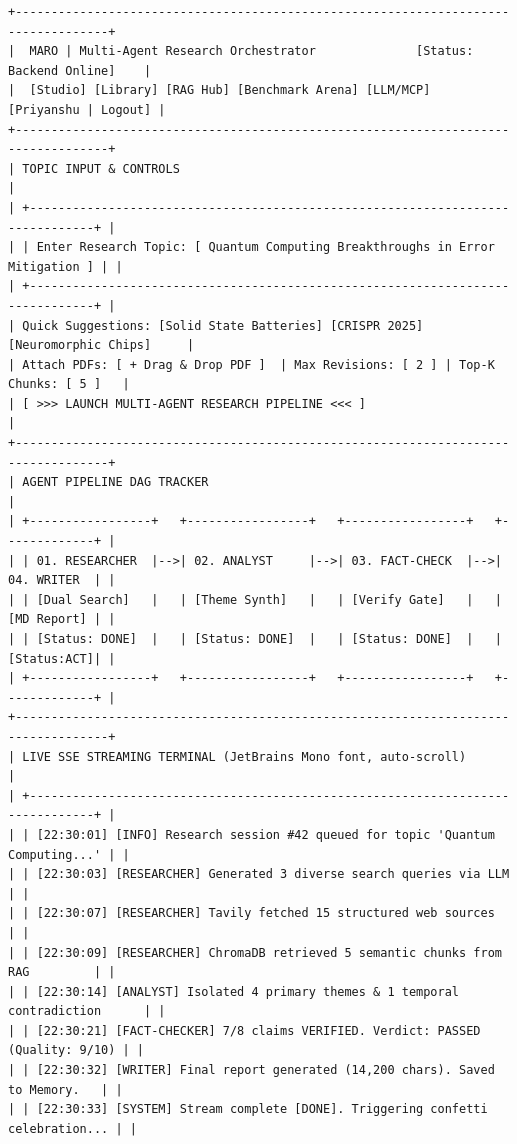 \documentclass[11pt,a4paper,twoside]{report}
\begin{document}
\begin{lstlisting}[language={},caption={ASCII Dashboard Layout}]
+-----------------------------------------------------------------------------------+
|  MARO | Multi-Agent Research Orchestrator              [Status: Backend Online]    |
|  [Studio] [Library] [RAG Hub] [Benchmark Arena] [LLM/MCP]       [Priyanshu | Logout] |
+-----------------------------------------------------------------------------------+
| TOPIC INPUT & CONTROLS                                                             |
| +-------------------------------------------------------------------------------+ |
| | Enter Research Topic: [ Quantum Computing Breakthroughs in Error Mitigation ] | |
| +-------------------------------------------------------------------------------+ |
| Quick Suggestions: [Solid State Batteries] [CRISPR 2025] [Neuromorphic Chips]     |
| Attach PDFs: [ + Drag & Drop PDF ]  | Max Revisions: [ 2 ] | Top-K Chunks: [ 5 ]   |
| [ >>> LAUNCH MULTI-AGENT RESEARCH PIPELINE <<< ]                                  |
+-----------------------------------------------------------------------------------+
| AGENT PIPELINE DAG TRACKER                                                        |
| +-----------------+   +-----------------+   +-----------------+   +-------------+ |
| | 01. RESEARCHER  |-->| 02. ANALYST     |-->| 03. FACT-CHECK  |-->| 04. WRITER  | |
| | [Dual Search]   |   | [Theme Synth]   |   | [Verify Gate]   |   | [MD Report] | |
| | [Status: DONE]  |   | [Status: DONE]  |   | [Status: DONE]  |   | [Status:ACT]| |
| +-----------------+   +-----------------+   +-----------------+   +-------------+ |
+-----------------------------------------------------------------------------------+
| LIVE SSE STREAMING TERMINAL (JetBrains Mono font, auto-scroll)                    |
| +-------------------------------------------------------------------------------+ |
| | [22:30:01] [INFO] Research session #42 queued for topic 'Quantum Computing...' | |
| | [22:30:03] [RESEARCHER] Generated 3 diverse search queries via LLM             | |
| | [22:30:07] [RESEARCHER] Tavily fetched 15 structured web sources              | |
| | [22:30:09] [RESEARCHER] ChromaDB retrieved 5 semantic chunks from RAG         | |
| | [22:30:14] [ANALYST] Isolated 4 primary themes & 1 temporal contradiction      | |
| | [22:30:21] [FACT-CHECKER] 7/8 claims VERIFIED. Verdict: PASSED (Quality: 9/10) | |
| | [22:30:32] [WRITER] Final report generated (14,200 chars). Saved to Memory.   | |
| | [22:30:33] [SYSTEM] Stream complete [DONE]. Triggering confetti celebration... | |

\end{lstlisting}
\end{document}
